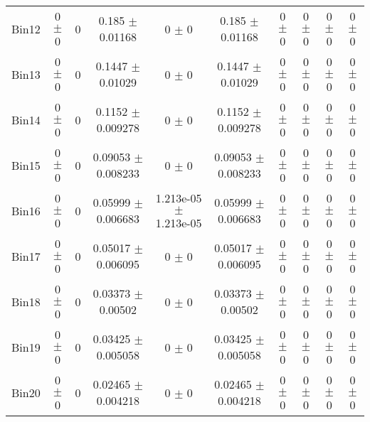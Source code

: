 \begin{tabular}{@{\extracolsep{4pt}}lccccccccc@{}}
     Bin12 & 0 $\pm$ 0 & 0 & 0.185 $\pm$ 0.01168 & 0 $\pm$ 0 & 0.185 $\pm$ 0.01168 & 0 $\pm$ 0 & 0 $\pm$ 0 & 0 $\pm$ 0 & 0 $\pm$ 0 \\ 
     Bin13 & 0 $\pm$ 0 & 0 & 0.1447 $\pm$ 0.01029 & 0 $\pm$ 0 & 0.1447 $\pm$ 0.01029 & 0 $\pm$ 0 & 0 $\pm$ 0 & 0 $\pm$ 0 & 0 $\pm$ 0 \\ 
     Bin14 & 0 $\pm$ 0 & 0 & 0.1152 $\pm$ 0.009278 & 0 $\pm$ 0 & 0.1152 $\pm$ 0.009278 & 0 $\pm$ 0 & 0 $\pm$ 0 & 0 $\pm$ 0 & 0 $\pm$ 0 \\ 
     Bin15 & 0 $\pm$ 0 & 0 & 0.09053 $\pm$ 0.008233 & 0 $\pm$ 0 & 0.09053 $\pm$ 0.008233 & 0 $\pm$ 0 & 0 $\pm$ 0 & 0 $\pm$ 0 & 0 $\pm$ 0 \\ 
     Bin16 & 0 $\pm$ 0 & 0 & 0.05999 $\pm$ 0.006683 & 1.213e-05 $\pm$ 1.213e-05 & 0.05999 $\pm$ 0.006683 & 0 $\pm$ 0 & 0 $\pm$ 0 & 0 $\pm$ 0 & 0 $\pm$ 0 \\ 
     Bin17 & 0 $\pm$ 0 & 0 & 0.05017 $\pm$ 0.006095 & 0 $\pm$ 0 & 0.05017 $\pm$ 0.006095 & 0 $\pm$ 0 & 0 $\pm$ 0 & 0 $\pm$ 0 & 0 $\pm$ 0 \\ 
     Bin18 & 0 $\pm$ 0 & 0 & 0.03373 $\pm$ 0.00502 & 0 $\pm$ 0 & 0.03373 $\pm$ 0.00502 & 0 $\pm$ 0 & 0 $\pm$ 0 & 0 $\pm$ 0 & 0 $\pm$ 0 \\ 
     Bin19 & 0 $\pm$ 0 & 0 & 0.03425 $\pm$ 0.005058 & 0 $\pm$ 0 & 0.03425 $\pm$ 0.005058 & 0 $\pm$ 0 & 0 $\pm$ 0 & 0 $\pm$ 0 & 0 $\pm$ 0 \\ 
     Bin20 & 0 $\pm$ 0 & 0 & 0.02465 $\pm$ 0.004218 & 0 $\pm$ 0 & 0.02465 $\pm$ 0.004218 & 0 $\pm$ 0 & 0 $\pm$ 0 & 0 $\pm$ 0 & 0 $\pm$ 0 \\ 
\hline\hline
  \end{tabular}
